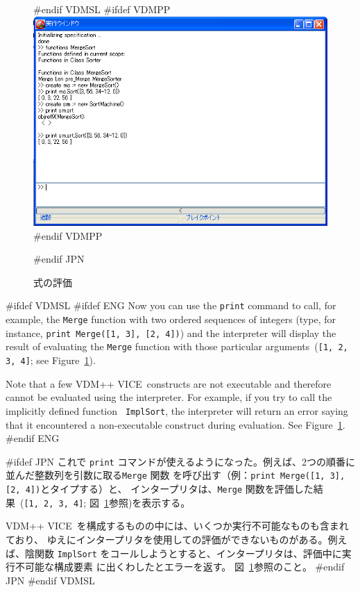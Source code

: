 \documentclass[\pformat,12pt]{article}
\newcommand{\vdmslpp}{VDM-SL}
\newcommand{\vdmslpp}{VDM++}
\renewcommand{\vdmslpp}{VDM++ VICE}
\newcommand{\aaa}{\tt }
\begin{document}
\begin{figure}[tbh]
\begin{center}
#endif VDMSL
#ifdef VDMPP
\includegraphics[width=15cm]{evalExpr-pp.png}
#endif VDMPP
\caption{式の評価}
#endif JPN
\label{fig:evalgui}
\end{center}
\end{figure}

#ifdef VDMSL 
#ifdef ENG
Now you can use the {\tt print} command to call, for example, the
{\aaa Merge} function with two ordered sequences of integers (type,
for instance, {\tt print Merge([1, 3], [2, 4])}) and the
interpreter will display the result of evaluating the {\aaa Merge}
function with those particular arguments~({\tt [1, 2, 3, 4]};
see Figure~\ref{fig:evalgui}).

Note that a few \vdmslpp\ constructs are not executable and therefore
cannot be evaluated using the interpreter. For example, if you try
to call the implicitly defined function   {\aaa
  ImplSort}, the interpreter will return an error saying that it
encountered a non-executable construct during evaluation.  See Figure~\ref{fig:evalgui}. 
#endif ENG

#ifdef JPN
これで {\tt print} コマンドが使えるようになった。例えば、2つの順番に並んだ整数列を引数に取る{\aaa Merge} 関数
を呼び出す（例：{\tt print Merge([1, 3], [2, 4])}とタイプする）と、
インタープリタは、{\aaa Merge} 関数を評価した結果~({\tt [1, 2, 3, 4]}; 図~\ref{fig:evalgui}参照)を表示する。 

 \vdmslpp\ を構成するものの中には、いくつか実行不可能なものも含まれており、
 ゆえにインタープリタを使用しての評価ができないものがある。例えば、陰関数
  {\aaa ImplSort}
 をコールしようとすると、インタープリタは、評価中に実行不可能な構成要素
 に出くわしたとエラーを返す。
 図~\ref{fig:evalgui}参照のこと。
#endif JPN
#endif VDMSL
\end{document}
